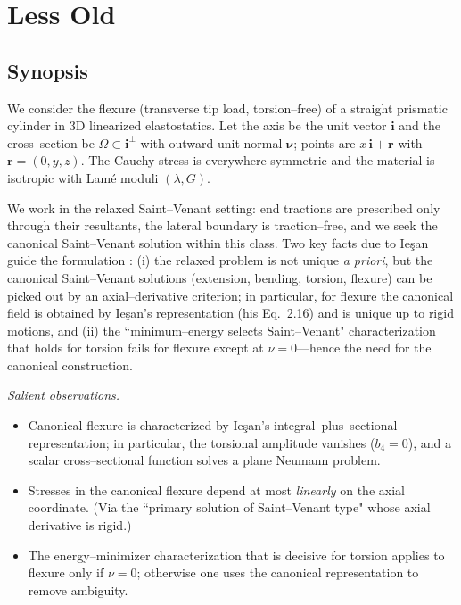 \section{Less Old}
\subsection*{Synopsis}

We consider the flexure (transverse tip load, torsion–free) of a straight prismatic cylinder in 3D linearized elastostatics. 
Let the axis be the unit vector $\mathbf{i}$ and the cross–section be $\Omega\subset\mathbf{i}^\perp$ with outward unit normal $\bm{\nu}$; points are $x\,\mathbf{i}+\bm{r}$ with $\bm{r}=(0,y,z)$. The Cauchy stress is everywhere symmetric and the material is isotropic with Lamé moduli $(\lambda,G)$.

We work in the relaxed Saint–Venant setting: end tractions are prescribed only through their resultants, the lateral boundary is traction–free, and we seek the canonical Saint–Venant solution within this class. 
Two key facts due to Ieşan guide the formulation \citep{iesan1986saintvenants}: (i) the relaxed problem is not unique \emph{a priori}, but the canonical Saint–Venant solutions (extension, bending, torsion, flexure) can be picked out by an axial–derivative criterion; in particular, for flexure the canonical field is obtained by Ieşan’s representation (his Eq.\ 2.16) and is unique up to rigid motions, and 
(ii) the ``minimum–energy selects Saint–Venant" characterization that holds for torsion fails for flexure except at $\nu=0$—hence the need for the canonical construction. 

\smallskip
\noindent\textit{Salient observations.}
\begin{itemize}
\item Canonical flexure is characterized by Ieşan’s integral–plus–sectional representation; in particular, the torsional amplitude vanishes ($b_4=0$), and a scalar cross–sectional function solves a plane Neumann problem. 
\item Stresses in the canonical flexure depend at most \emph{linearly} on the axial coordinate. (Via the ``primary solution of Saint–Venant type" whose axial derivative is rigid.)
\item The energy–minimizer characterization that is decisive for torsion applies to flexure only if $\nu=0$; otherwise one uses the canonical representation to remove ambiguity.
\end{itemize}

